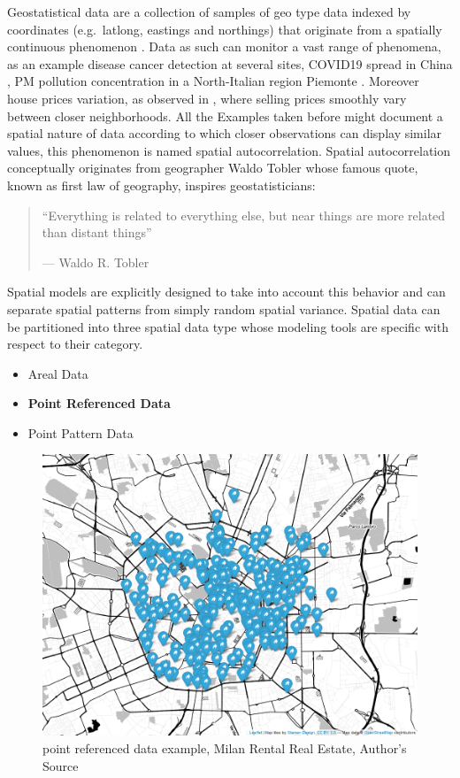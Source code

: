 \documentclass[
  12pt,
  a4paper,
  oneside]{book}
\providecommand{\tightlist}{%
  \setlength{\itemsep}{0pt}\setlength{\parskip}{0pt}}
\theoremstyle{definition}
\theoremstyle{definition}
\theoremstyle{definition}
\theoremstyle{remark}
\begin{document}
Geostatistical data are a collection of samples of geo type data indexed by coordinates (e.g.~latlong, eastings and northings) that originate from a spatially continuous phenomenon \citep{Moraga2019}. Data as such can monitor a vast range of phenomena, as an example disease cancer detection \citep{Bell2006} at several sites, COVID19 spread in China \citep{Li_Li_Ding_Hu_Chen_Wang_Peng_Shen_2020}, PM pollution concentration in a North-Italian region Piemonte \citep{Cameletti2012}. Moreover house prices variation, as observed in \citet{Bayesian_INLA_Rubio}, where selling prices smoothly vary between closer neighborhoods. All the Examples taken before might document a spatial nature of data according to which closer observations can display similar values, this phenomenon is named spatial autocorrelation. Spatial autocorrelation conceptually originates from geographer Waldo Tobler whose famous quote, known as first law of geography, inspires geostatisticians:

\begin{quote}
``Everything is related to everything else,
but near things are more related than distant things''

\hfill --- Waldo R. Tobler
\end{quote}

Spatial models are explicitly designed to take into account this behavior and can separate spatial patterns from simply random spatial variance.
Spatial data can be partitioned into three spatial data type whose modeling tools are specific with respect to their category.

\begin{itemize}
\tightlist
\item
  Areal Data
\item
  \textbf{Point Referenced Data}
\item
  Point Pattern Data
\end{itemize}

\begin{figure}
\centering
\includegraphics{images/map.png}
\caption{point referenced data example, Milan Rental Real Estate, Author's Source}
\end{figure}
\end{document}
